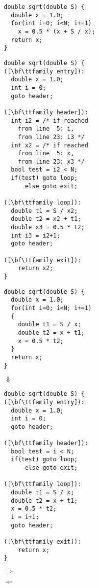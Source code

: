 \centering
\begin{minipage}{0.48\textwidth}
\centering
\vspace{3mm}
\begin{lstlisting}[language=MyCpp,captionpos=t,title=
   {{\bf(a)} {} C source function:\leftskip=0pt}]
double sqrt(double S) {
  double x = 1.0;
  for(int i=0; i<N; i+=1)
    x = 0.5 * (x + S / x);
  return x;
}
\end{lstlisting}
\phantom{\Huge$\Uparrow$}
\begin{lstlisting}[language=MyCpp,captionpos=t,title=
   {{\bf(d)} {} The SSA property is introduced:\leftskip=0pt}]
double sqrt(double S) {
([\bf\ttfamily entry]):
  double x = 1.0;
  int i = 0;
  goto header;

([\bf\ttfamily header]):
  int i2 = /* if reached
    from line  5: i,
    from line 23: i3 */
  int x2 = /* if reached
    from line  5: x,
    from line 23: x3 */
  bool test = i2 < N;
  if(test) goto loop;
      else goto exit;

([\bf\ttfamily loop]):
  double t1 = S / x2;
  double t2 = x2 + t1;
  double x3 = 0.5 * t2;
  int i3 = i2+1;
  goto header;

([\bf\ttfamily exit]):
    return x2;
}
\end{lstlisting}
\end{minipage}
\hfill
\begin{minipage}{0.48\textwidth}
\centering
\vspace{3mm}
\begin{lstlisting}[language=MyCpp,title=
   {{\bf(b)} {} Complex expressions are broken down:\leftskip=0pt}]
double sqrt(double S) {
  double x = 1.0;
  for(int i=0; i<N; i+=1)
  {
    double t1 = S / x;
    double t2 = x + t1;
    x = 0.5 * t2;
  }
  return x;
}
\end{lstlisting}
{\Huge$\Downarrow$}
\begin{lstlisting}[language=MyCpp,title=
   {{\bf(c)} {} Structured control flow is expanded:\leftskip=0pt}]
double sqrt(double S) {
([\bf\ttfamily entry]):
  double x = 1.0;
  int i = 0;
  goto header;

([\bf\ttfamily header]):
  bool test = i < N;
  if(test) goto loop;
      else goto exit;

([\bf\ttfamily loop]):
  double t1 = S / x;
  double t2 = x + t1;
  x = 0.5 * t2;
  i = i+1;
  goto header;

([\bf\ttfamily exit]):
    return x;
}
\end{lstlisting}
\end{minipage}
\hspace{-\textwidth}
\begin{minipage}{\textwidth}
\centering
\Huge
\hfuzz=5cm

$\Rightarrow$

\vspace{9.5cm}

$\Leftarrow$\hspace{0.5cm}

\vspace{3.5cm}
\end{minipage}
